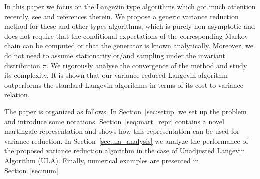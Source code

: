 \documentclass[bj]{imsart}
\begin{document}
\par
In this paper we focus on the  Langevin type algorithms which got much attention recently, see \cite{dalalyan2017theoretical,durmus:moulines:2017, MR2353037, MR3861816, MR2977986} and references therein. We propose  a generic variance reduction method for these and other types algorithms, which is purely non-asymptotic and does not require that    the conditional expectations of the corresponding Markov chain can be computed  or that the generator is known analytically. Moreover, we do not need to assume stationarity or/and sampling under the invariant distribution \(\pi.\) We rigorously analyse the convergence of the method and study its complexity. It is shown that  our variance-reduced Langevin algorithm outperforms the standard Langevin algorithms in terms of its cost-to-variance relation.
\par
The paper is organized as follows.  In Section~\ref{sec:setup} we set up the problem and introduce some notations. Section~\ref{seq:mart_repr} contains a novel martingale representation and shows how this representation can be used for variance reduction. In Section~\ref{sec:ula_analysis} we analyze the performance of the proposed variance reduction algorithm in the case of Unadjusted Langevin Algorithm (ULA).  Finally, numerical examples are presented in Section~\ref{sec:num}.
\end{document}
